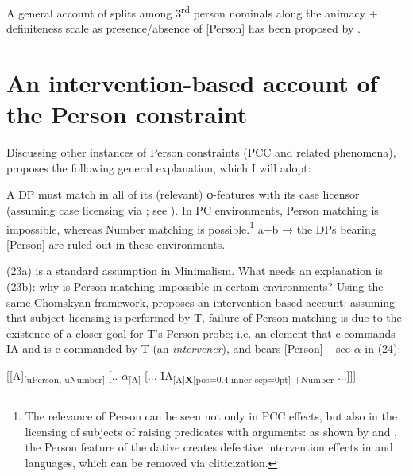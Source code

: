 \documentclass[output=paper]{langsci/langscibook}
\begin{document}
A general account of splits among 3\textsuperscript{rd} person nominals along the animacy + definiteness scale as presence\slash absence of [Person] has been proposed by \citet{Richards2008}.

\section{An intervention-based account of the Person constraint}%

Discussing other instances of Person constraints (PCC and related phenomena), \citet{Rezac2011} proposes the following general explanation, which I will adopt:

\ea\label{ex:guirgea:23}\label{bkm:Ref443240869}
        \ea A DP must match in all of its (relevant) φ-features with its case licensor (assuming case licensing via ; see \citealt{Chomsky2000,Chomsky2001Derivation}).
        \ex In PC environments, Person matching is impossible, whereas Number matching is possible.\footnote{The relevance of Person can be seen not only in PCC effects, but also in the licensing of subjects of raising predicates with  arguments: as shown by \citet{Anagnostopoulou2003,Anagnostopoulou2005Cross} and \citet{Marchis2013}, the Person feature of the dative  creates defective intervention effects in  and  languages, which can be removed via cliticization.}  
        \ex  a+b → the DPs bearing [Person] are ruled out in these environments.
        \z
\z

(23a) is a standard assumption in Minimalism. What needs an explanation is (23b): why is Person matching impossible in certain environments? Using the same Chomskyan framework, \citet{Rezac2011} proposes an intervention-based account: assuming that subject licensing is performed by T, failure of Person matching is due to the existence of a closer goal for T’s Person probe; i.e. an element that c-commands IA and is c-commanded by T (an \textit{intervener}), and bears [Person] – see $\alpha $ in (24):

\ea%
    \label{ex:giurgea:24}
    [[A]\textsubscript{[uPerson, uNumber]}  [.. $\alpha $\textsubscript{[A]}  [... IA\textsubscript{[A]{\textsf{\bfseries X}}[pos=0.4,inner sep=0pt] +Number} ...]]]
\z
\end{document}
